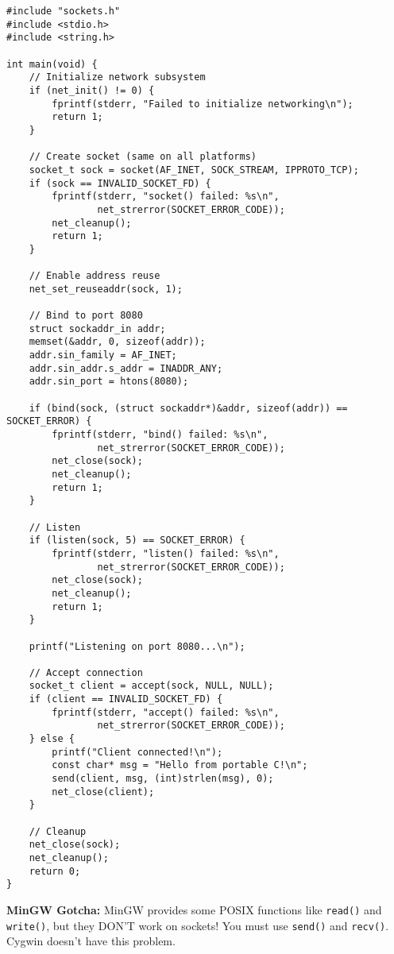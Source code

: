 \begin{lstlisting}
#include "sockets.h"
#include <stdio.h>
#include <string.h>

int main(void) {
    // Initialize network subsystem
    if (net_init() != 0) {
        fprintf(stderr, "Failed to initialize networking\n");
        return 1;
    }

    // Create socket (same on all platforms)
    socket_t sock = socket(AF_INET, SOCK_STREAM, IPPROTO_TCP);
    if (sock == INVALID_SOCKET_FD) {
        fprintf(stderr, "socket() failed: %s\n",
                net_strerror(SOCKET_ERROR_CODE));
        net_cleanup();
        return 1;
    }

    // Enable address reuse
    net_set_reuseaddr(sock, 1);

    // Bind to port 8080
    struct sockaddr_in addr;
    memset(&addr, 0, sizeof(addr));
    addr.sin_family = AF_INET;
    addr.sin_addr.s_addr = INADDR_ANY;
    addr.sin_port = htons(8080);

    if (bind(sock, (struct sockaddr*)&addr, sizeof(addr)) == SOCKET_ERROR) {
        fprintf(stderr, "bind() failed: %s\n",
                net_strerror(SOCKET_ERROR_CODE));
        net_close(sock);
        net_cleanup();
        return 1;
    }

    // Listen
    if (listen(sock, 5) == SOCKET_ERROR) {
        fprintf(stderr, "listen() failed: %s\n",
                net_strerror(SOCKET_ERROR_CODE));
        net_close(sock);
        net_cleanup();
        return 1;
    }

    printf("Listening on port 8080...\n");

    // Accept connection
    socket_t client = accept(sock, NULL, NULL);
    if (client == INVALID_SOCKET_FD) {
        fprintf(stderr, "accept() failed: %s\n",
                net_strerror(SOCKET_ERROR_CODE));
    } else {
        printf("Client connected!\n");
        const char* msg = "Hello from portable C!\n";
        send(client, msg, (int)strlen(msg), 0);
        net_close(client);
    }

    // Cleanup
    net_close(sock);
    net_cleanup();
    return 0;
}
\end{lstlisting}

\begin{warningbox}
\textbf{MinGW Gotcha:} MinGW provides some POSIX functions like \texttt{read()} and \texttt{write()}, but they DON'T work on sockets! You must use \texttt{send()} and \texttt{recv()}. Cygwin doesn't have this problem.
\end{warningbox}

